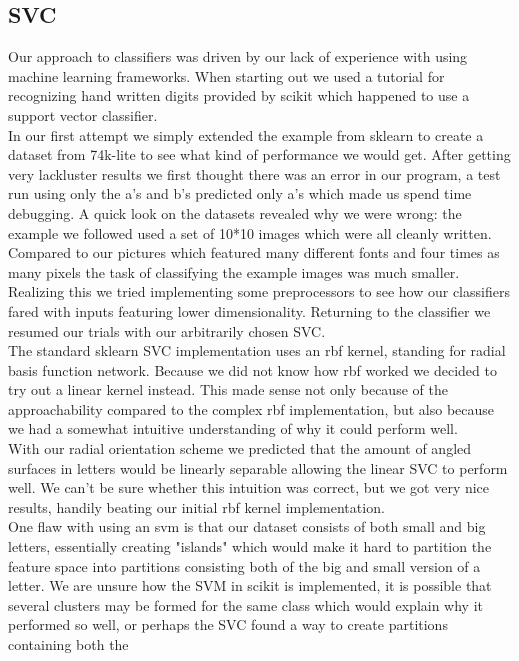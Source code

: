 \documentclass[paper=a4, fontsize=11pt]{scrartcl} %
\numberwithin{equation}{section} %
\numberwithin{figure}{section} %
\numberwithin{table}{section} %
\begin{document}
\subsection{SVC}
Our approach to classifiers was driven by our lack of experience with
using machine learning frameworks.  When starting out we used a
tutorial for recognizing hand written digits provided by scikit which
happened to use a support vector classifier.\\
In our first attempt we simply extended the example from sklearn to
create a dataset from 74k-lite to see what kind of performance we
would get.  After getting very lackluster results we first thought
there was an error in our program, a test run using only the a's and
b's predicted only a's which made us spend time debugging.  A quick
look on the datasets revealed why we were wrong: the example we
followed used a set of 10*10 images which were all cleanly written.\\
Compared to our pictures which featured many different fonts and four
times as many pixels the task of classifying the example images was
much smaller.  Realizing this we tried implementing some preprocessors
to see how our classifiers fared with inputs featuring lower
dimensionality.  Returning to the classifier we resumed our trials
with our arbitrarily chosen SVC.\\  The standard sklearn SVC
implementation uses an rbf kernel, standing for radial basis function
network.  Because we did not know how rbf worked we decided to try out
a linear kernel instead.  This made sense not only because of the
approachability compared to the complex rbf implementation, but also
because we had a somewhat intuitive understanding of why it could
perform well.\\  With our radial orientation scheme we predicted that
the amount of angled surfaces in letters would be linearly separable
allowing the linear SVC to perform well.  We can't be sure whether
this intuition was correct, but we got very nice results, handily
beating our initial rbf kernel implementation.\\  One flaw with using an
svm is that our dataset consists of both small and big letters,
essentially creating "islands" which would make it hard to partition
the feature space into partitions consisting both of the big and small
version of a letter.  We are unsure how the SVM in scikit is
implemented, it is possible that several clusters may be formed for
the same class which would explain why it performed so well, or
perhaps the SVC found a way to create partitions containing both the
\end{document}
